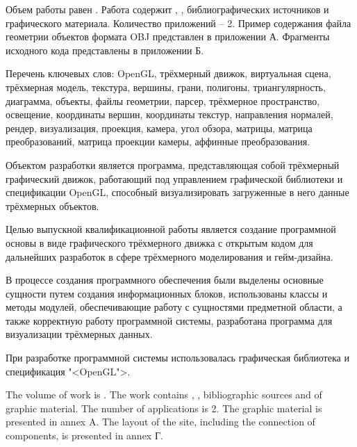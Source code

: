 
Объем работы равен . Работа содержит , ,  библиографических источников и  графического материала. Количество приложений – 2. Пример содержания файла геометрии объектов формата OBJ представлен в приложении А. Фрагменты исходного кода представлены в приложении Б.

Перечень ключевых слов: OpenGL, трёхмерный движок, виртуальная сцена, трёхмерная модель, текстура, вершины, грани, полигоны, триангулярность, диаграмма, объекты, файлы геометрии, парсер, трёхмерное пространство, освещение, координаты вершин, координаты текстур, направления нормалей, рендер, визуализация, проекция, камера, угол обзора, матрицы, матрица преобразований, матрица проекции камеры, аффинные преобразования.

Объектом разработки является программа, представляющая собой трёхмерный графический движок, работающий под управлением графической библиотеки и спецификации OpenGL, способный визуализировать загруженные в него данные трёхмерных объектов.

Целью выпускной квалификационной работы является создание программной основы в виде графического трёхмерного движка с открытым кодом для дальнейших разработок в сфере трёхмерного моделирования и гейм-дизайна.

В процессе создания программного обеспечения были выделены основные сущности путем создания информационных блоков, использованы классы и методы модулей, обеспечивающие работу с сущностями предметной области, а также корректную работу программной системы, разработана программа для визуализации трёхмерных данных.

При разработке программной системы использовалась графическая библиотека и спецификация "<OpenGL">.

  
The volume of work is . The work contains , ,  bibliographic sources and  of graphic material. The number of applications is 2. The graphic material is presented in annex A. The layout of the site, including the connection of components, is presented in annex Г.

